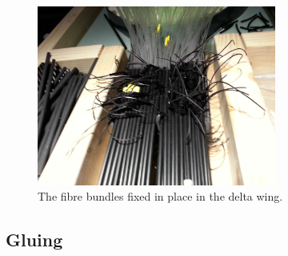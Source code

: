 \begin{figure}
	\centering
	\includegraphics[width=0.7\textwidth]{ImgChap1/deltacord}
	\caption{The fibre bundles fixed in place in the delta wing.}		
	\label{deltacord}
\end{figure}

			
			
			
			






			



			
\subsection{Gluing} 
			
